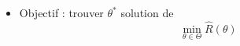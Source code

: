 \documentclass[c]{beamer}
\begin{document}
\begin{frame}
\begin{columns}
\begin{column}{.4\textwidth}
{      }
    \end{column}
  \end{columns}
  \begin{itemize}
    \item<5-> Objectif : trouver $\theta^*$ solution de
      \[
        \min_{\theta \in \Theta} \hat{R}\left( \theta \right)
      \]
  \end{itemize}

\end{frame}
\end{document}
